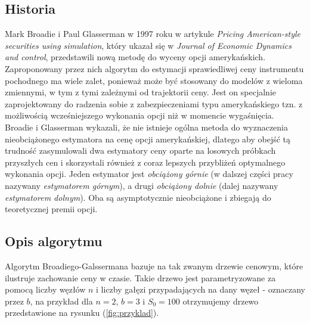 \documentclass[12pt]{article}
\begin{document}
\subsection{Historia}
Mark Broadie i Paul Glasserman w 1997 roku w artykule \textit{Pricing American-style securities using simulation}, który ukazał się w \textit{Journal of Economic Dynamics and control}, przedstawili nową metodę do wyceny opcji amerykańskich. Zaproponowany przez nich algorytm do estymacji sprawiedliwej ceny instrumentu pochodnego ma wiele zalet, ponieważ może być stosowany do modelów z wieloma zmiennymi, w tym z tymi zależnymi od trajektorii ceny. Jest on specjalnie zaprojektowany do radzenia sobie z zabezpieczeniami typu amerykańskiego tzn. z możliwością wcześniejszego wykonania opcji niż w momencie wygaśnięcia.\\

\noindent Broadie i Glasserman wykazali, że nie istnieje ogólna metoda do wyznaczenia nieobciążonego estymatora na cenę opcji amerykańskiej, dlatego aby obejść tą trudność zasymulowali dwa estymatory ceny oparte na losowych próbkach przyszłych cen i skorzystali również z coraz lepszych przybliżeń optymalnego wykonania opcji. Jeden estymator jest \textit{obciążony górnie} (w dalszej części pracy nazywany \textit{estymatorem górnym}), a drugi \textit{obciążony dolnie} (dalej nazywany \textit{estymatorem dolnym}). Oba są asymptotycznie nieobciążone i zbiegają do teoretycznej premii opcji.

\subsection{Opis algorytmu}

Algorytm Broadiego-Galssermana bazuje na tak zwanym drzewie cenowym, które ilustruje zachowanie ceny w czasie. Takie drzewo jest parametryzowane za pomocą liczby węzłów $n$ i liczby gałęzi przypadających na dany węzeł - oznaczany przez $b$, na przykład dla $n=2$, $b=3$ i $S_0 = 100$ otrzymujemy drzewo przedstawione na rysunku (\ref{fig:przyklad}).
\end{document}
